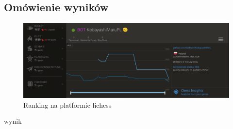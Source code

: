 \subsection{Omówienie wyników}
\label{subsec:omowienie-wynikow}

\begin{figure}[ht]
    \centering
    \includegraphics[width=1\linewidth]{rozdzialy/rozdzial03/2_porownanie-z-innymi-silnikami/rysunki/lichess-ranking}
    \caption{Ranking na platformie lichess}
    \label{fig:lichess-ranking}
\end{figure}
wynik
